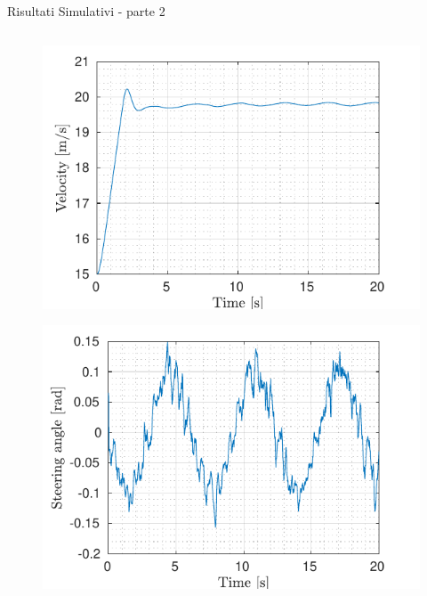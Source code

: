 \documentclass{beamer}
\begin{document}
	\begin{frame}{Risultati Simulativi - parte 2}	
		\vspace{-2.4em}
		\begin{columns}[onlytextwidth,T]
			\begin{column}[c]{0.5\columnwidth}
				\begin{figure}[!h]
				\includegraphics[width=0.92\columnwidth]{../../MATLAB/lane_following/figure/LongitudinalVelocityVsTime.pdf}
				\vspace{-0.5em}
				\end{figure}
				\begin{figure}[!h]
				\vspace{-3em}
				\includegraphics[width=0.92\columnwidth]{../../MATLAB/lane_following/figure/SteeringAngleVsTime.pdf}
				\vspace{-0.5em}

\end{figure}
\end{column}
\end{columns}
\end{frame}
\end{document}
